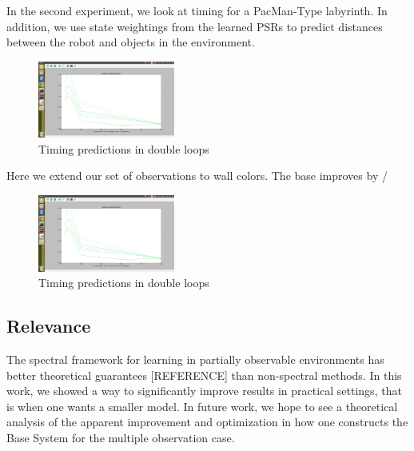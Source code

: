 \documentclass{acm_proc_article-sp}
\begin{document}
In the second experiment, we look at timing for a PacMan-Type labyrinth. In addition, we use state weightings from the learned PSRs to predict distances between the robot and objects in the environment. 

\begin{figure}[ht!]
\centering
\includegraphics[width=45mm]{PaperScreenShots/PacMan10000.png}
\caption{Timing predictions in double loops \label{overflow}}
\end{figure}

Here we extend our set of observations to wall colors. The base improves by /%

\begin{figure}[ht!]
\centering
\includegraphics[width=45mm]{PaperScreenShots/PacMan10000.png}
\caption{Timing predictions in double loops \label{overflow}}
\end{figure}

\subsection{Relevance}
The spectral framework for learning in partially observable environments has better theoretical guarantees [REFERENCE] than non-spectral methods. In this work, we showed a way to significantly improve results in practical settings, that is when one wants a smaller model. In future work, we hope to see a theoretical analysis of the apparent improvement and optimization in how one constructs the Base System for the multiple observation case. 

\end{document}
